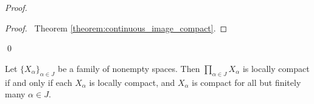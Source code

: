 \begin{proof}
    \pf
    \begin{proof}
        \pf\ Theorem \ref{theorem:continuous_image_compact}.
    \end{proof}
    \qed
\end{proof}

\begin{proposition}[AC]
    Let $\{ X_\alpha \}_{\alpha \in J}$ be a family of nonempty spaces. Then
    $\prod_{\alpha \in J} X_\alpha$ is locally compact if and only if each $X_\alpha$ is locally compact,
    and $X_\alpha$ is compact for all but finitely many $\alpha \in J$.
\end{proposition}

